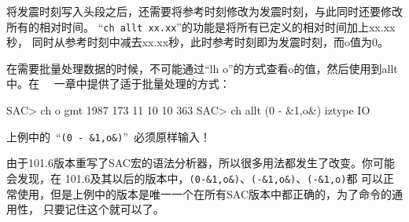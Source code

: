 将发震时刻写入头段之后，还需要将参考时刻修改为发震时刻，与此同时还要修改所有的相对时间。
``\verb+ch allt xx.xx+''的功能是将所有已定义的相对时间加上xx.xx秒，
同时从参考时刻中减去xx.xx秒，此时参考时刻即为发震时刻，而o值为0。

在需要批量处理数据的时候，不可能通过``lh o''的方式查看o的值，然后使用到allt中。在
~~一章中提供了适于批量处理的方式：
\begin{SACCode}
SAC> ch o gmt 1987 173 11 10 10 363 
SAC> ch allt (0 - &1,o&) iztype IO
\end{SACCode}

\begin{Tips}
上例中的~``\verb+(0 - &1,o&)+''~必须原样输入！
    
由于101.6版本重写了SAC宏的语法分析器，所以很多用法都发生了改变。你可能会发现，在
101.6及其以后的版本中，\verb+(0-&1,o&)+、\verb+(-&1,o&)+、\verb+(-&1,o)+都
可以正常使用，但是上例中的版本是唯一一个在所有SAC版本中都正确的，为了命令的通用性，
只要记住这个就可以了。
\end{Tips}
